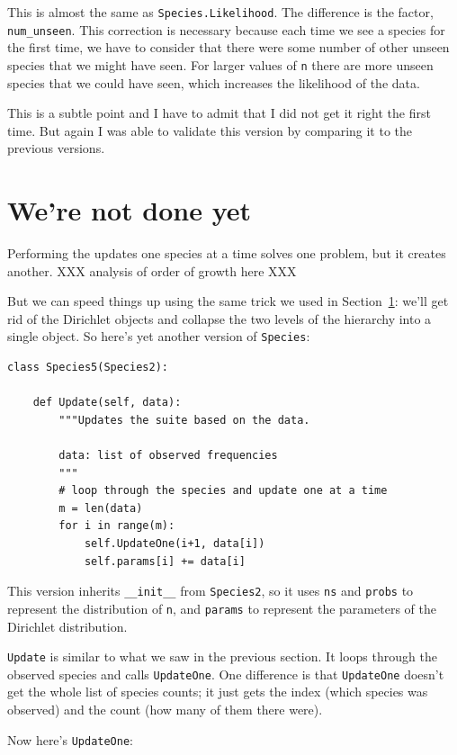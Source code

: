 \documentclass[12pt]{book}
\begin{document}
This is almost the same as {\tt Species.Likelihood}.  The difference
is the factor, \verb"num_unseen".  This correction is necessary
because each time we see a species for the first time, we have to
consider that there were some number of other unseen species that
we might have seen.  For larger values of {\tt n} there are more
unseen species that we could have seen, which increases the likelihood
of the data.

This is a subtle point and I have to admit that I did not get it right
the first time.  But again I was able to validate this version
by comparing it to the previous versions.

\section{We're not done yet}

Performing the updates one species at a time solves one problem, but
it creates another.  XXX analysis of order of growth here XXX

But we can speed things up using the same trick we used in Section~\ref{}:
we'll get rid of the Dirichlet objects and collapse the two levels
of the hierarchy into a single object.  So here's yet another version
of {\tt Species}:

\begin{verbatim}
class Species5(Species2):
    
    def Update(self, data):
        """Updates the suite based on the data.

        data: list of observed frequencies
        """
        # loop through the species and update one at a time
        m = len(data)
        for i in range(m):
            self.UpdateOne(i+1, data[i])
            self.params[i] += data[i]
\end{verbatim}

This version inherits \verb"__init__" from {\tt Species2}, so
it uses {\tt ns} and {\tt probs} to represent the distribution
of {\tt n}, and {\tt params} to represent the parameters of
the Dirichlet distribution.

{\tt Update} is similar to what we saw in the previous section.
It loops through the observed species and calls {\tt UpdateOne}.
One difference is that {\tt UpdateOne} doesn't get the whole list
of species counts; it just gets the index (which species was
observed) and the count (how many of them there were).

Now here's {\tt UpdateOne}:
\end{document}
